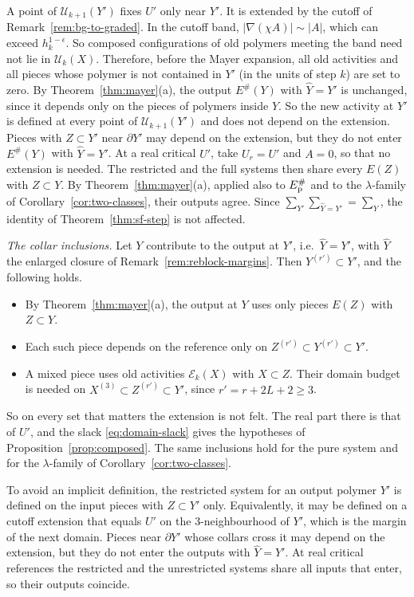 \begin{remark}\label{rem:extension}
A point of $\mathcal U_{k+1}(Y')$ fixes $U'$ only near $Y'$. It is extended by the cutoff of Remark~\ref{rem:bg-to-graded}. In the cutoff band, $|\nabla(\chi A)|\sim|A|$, which can exceed $h_k^{1-\epsilon}$. So composed configurations of old polymers meeting the band need not lie in $\mathcal U_k(X)$. Therefore, before the Mayer expansion, all old activities and all pieces whose polymer is not contained in $Y'$ (in the units of step $k$) are set to zero. By Theorem~\ref{thm:mayer}(a), the output $E^\#(Y)$ with $\hat Y=Y'$ is unchanged, since it depends only on the pieces of polymers inside $Y$. So the new activity at $Y'$ is defined at every point of $\mathcal U_{k+1}(Y')$ and does not depend on the extension. Pieces with $Z\subset Y'$ near $\partial Y'$ may depend on the extension, but they do not enter $E^\#(Y)$ with $\hat Y=Y'$. At a real critical $U'$, take $U_r=U'$ and $A=0$, so that no extension is needed. The restricted and the full systems then share every $E(Z)$ with $Z\subset Y$. By Theorem~\ref{thm:mayer}(a), applied also to $E^\#_{\rm p}$ and to the $\lambda$-family of Corollary~\ref{cor:two-classes}, their outputs agree. Since $\sum_{Y'}\sum_{\hat Y=Y'}=\sum_Y$, the identity of Theorem~\ref{thm:sf-step} is not affected.

\emph{The collar inclusions.} Let $Y$ contribute to the output at $Y'$, i.e.\ $\hat Y=Y'$, with $\hat Y$ the enlarged closure of Remark~\ref{rem:reblock-margins}. Then $Y^{(r')}\subset Y'$, and the following holds.
\begin{itemize}
\item By Theorem~\ref{thm:mayer}(a), the output at $Y$ uses only pieces $E(Z)$ with $Z\subset Y$.
\item Each such piece depends on the reference only on $Z^{(r')}\subset Y^{(r')}\subset Y'$.
\item A mixed piece uses old activities $\mathcal E_k(X)$ with $X\subset Z$. Their domain budget is needed on $X^{(3)}\subset Z^{(r')}\subset Y'$, since $r'=r+2L+2\ge3$.
\end{itemize}
So on every set that matters the extension is not felt. The real part there is that of $U'$, and the slack \eqref{eq:domain-slack} gives the hypotheses of Proposition~\ref{prop:composed}. The same inclusions hold for the pure system and for the $\lambda$-family of Corollary~\ref{cor:two-classes}.

To avoid an implicit definition, the restricted system for an output polymer $Y'$ is defined on the input pieces with $Z\subset Y'$ only. Equivalently, it may be defined on a cutoff extension that equals $U'$ on the $3$-neighbourhood of $Y'$, which is the margin of the next domain. Pieces near $\partial Y'$ whose collars cross it may depend on the extension, but they do not enter the outputs with $\hat Y=Y'$. At real critical references the restricted and the unrestricted systems share all inputs that enter, so their outputs coincide.
\end{remark}

